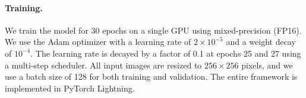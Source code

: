 \paragraph{Training.}
We train the model for 30 epochs on a single GPU using mixed-precision (FP16). We use the Adam optimizer with a learning rate of $2 \times 10^{-5}$ and a weight decay of $10^{-4}$. The learning rate is decayed by a factor of 0.1 at epochs 25 and 27 using a multi-step scheduler. All input images are resized to $256 \times 256$ pixels, and we use a batch size of 128 for both training and validation. The entire framework is implemented in PyTorch Lightning.
